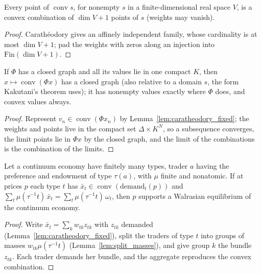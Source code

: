 \begin{lemma}
\label{lem:caratheodory_fixed}
\leanok
Every point of $\operatorname{conv} s$, for nonempty $s$ in a finite-dimensional real space $V$, is a convex combination of
$\dim V + 1$ points of $s$ (weights may vanish).
\end{lemma}
\begin{proof}
\leanok
Carath\'eodory gives an affinely independent family, whose cardinality is at most $\dim V + 1$; pad the weights with zeros
along an injection into $\mathrm{Fin}(\dim V + 1)$.
\end{proof}

\begin{theorem}
\label{thm:closed_graph_conv}
\leanok
{}
If $\Phi$ has a closed graph and all its values lie in one compact $K$, then $x \mapsto \operatorname{conv}(\Phi x)$ has a
closed graph (also relative to a domain $s$, the form Kakutani's theorem uses); it has nonempty values exactly where
$\Phi$ does, and convex values always.
\end{theorem}
\begin{proof}
\leanok
Represent $v_n \in \operatorname{conv}(\Phi x_n)$ by Lemma~\ref{lem:caratheodory_fixed}; the weights and points live in the
compact set $\Delta \times K^{N}$, so a subsequence converges, the limit points lie in $\Phi x$ by the closed graph, and the
limit of the combinations is the combination of the limits.
\end{proof}

\begin{theorem}
\label{thm:convexification_bridge}
\leanok
{}
Let a continuum economy have finitely many types, trader $a$ having the preference and endowment of type $\tau(a)$, with
$\mu$ finite and nonatomic. If at prices $p$ each type $t$ has $\bar x_t \in \operatorname{conv} (\text{demand}_t(p))$ and
$\sum_t \mu(\tau^{-1} t)\, \bar x_t = \sum_t \mu(\tau^{-1} t)\, \omega_t$, then $p$ supports a Walrasian equilibrium of the
continuum economy.
\end{theorem}
\begin{proof}
\leanok
Write $\bar x_t = \sum_k w_{tk} z_{tk}$ with $z_{tk}$ demanded (Lemma~\ref{lem:caratheodory_fixed}), split the traders of
type $t$ into groups of masses $w_{tk}\mu(\tau^{-1} t)$ (Lemma~\ref{lem:split_masses}), and give group $k$ the bundle
$z_{tk}$. Each trader demands her bundle, and the aggregate reproduces the convex combination.
\end{proof}

